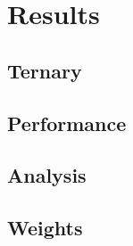 \documentclass{scrbook}
\begin{document}
\chapter{Results}

\section{Ternary}
\clearpage


\clearpage
\section{Performance}





\clearpage
\section{Analysis}





\clearpage
\section{Weights}



\end{document}
